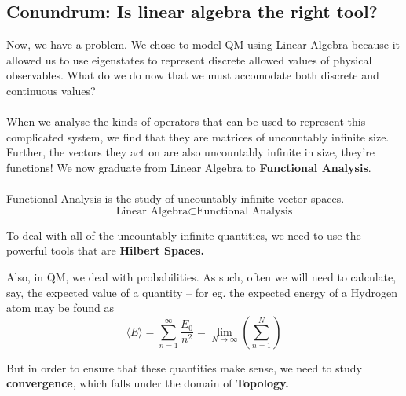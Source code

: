 \documentclass[twoside]{article}
\begin{document}
\subsection*{Conundrum: Is linear algebra the right tool?}
Now, we have a problem. We chose to model QM using Linear Algebra because it allowed us to use eigenstates to represent discrete allowed values of physical observables. What do we do now that we must accomodate both discrete and continuous values?
\\
\\
When we analyse the kinds of operators that can be used to represent this complicated system, we find that they are matrices of uncountably infinite size. Further, the vectors they act on are also uncountably infinite in size, they're functions! We now graduate from Linear Algebra to \textbf{Functional Analysis}.
\\
\\
Functional Analysis is the study of uncountably infinite vector spaces.
\[ \boxed{\text{Linear Algebra} \subset \text{Functional Analysis} } \]

To deal with all of the uncountably infinite quantities, we need to use the powerful tools that are \textbf{Hilbert Spaces.}

Also, in QM, we deal with probabilities. As such, often we will need to calculate, say, the expected value of a quantity -- for eg. the expected energy of a Hydrogen atom may be found as
\[ \langle E \rangle = \sum_{n=1}^{\infty} \frac{E_0}{n^2} = \lim_{N \rightarrow \infty} \left( \sum_{n=1}^{N} \right) \]

But in order to ensure that these quantities make sense, we need to study \textbf{convergence}, which falls under the domain of \textbf{Topology.}
\end{document}
